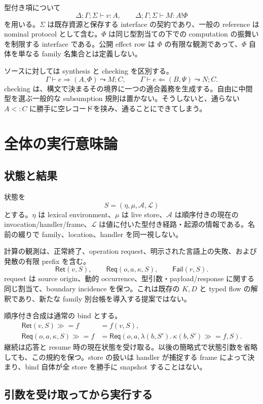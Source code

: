 \documentclass[11pt,a4paper]{article}
\theoremstyle{remark}
\newcommand{\Ret}{\mathsf{Ret}}
\newcommand{\Req}{\mathsf{Req}}
\newcommand{\bind}{\mathbin{\gg\!=}}
\begin{document}
型付き項について
\[
\Delta;\Gamma;\Sigma\vdash v:A,
\qquad
\Delta;\Gamma;\Sigma\vdash M:A\mathbin{!}\Phi
\]
を用いる。$\Sigma$ は既存資源と保存する interface の契約であり、一般の reference は nominal protocol として含む。$\Phi$ は同じ型割当ての下での computation の振舞いを制限する interface である。公開 effect row は $\Phi$ の有限な観測であって、$\Phi$ 自体を単なる family 名集合とは定義しない。

ソースに対しては synthesis と checking を区別する。
\[
\Gamma\vdash e\Rightarrow(A,\Phi)\leadsto M;C,
\qquad
\Gamma\vdash e\Leftarrow(B,\Psi)\leadsto N;C.
\]
checking は、構文で決まるその境界に一つの適合義務を生成する。自由に中間型を選ぶ一般的な subsumption 規則は置かない。そうしないと、通らない $A<:C$ に勝手に空レコードを挟み、通ることにできてしまう。

\section{全体の実行意味論}

\subsection{状態と結果}

状態を
\[
S=(\eta,\mu,\mathcal A,\mathcal L)
\]
とする。$\eta$ は lexical environment、$\mu$ は live store、$\mathcal A$ は順序付きの現在の invocation/handler/frame、$\mathcal L$ は値に付いた型付き経路・起源の情報である。名前の綴りで family、location、handler を同一視しない。

計算の観測は、正常終了、operation request、明示された言語上の失敗、および発散の有限 prefix を含む。
\[
\Ret(v,S),\qquad \Req(o,a,\kappa,S),\qquad
\mathsf{Fail}(r,S).
\]
request は source origin、動的 occurrence、型引数・payload/response に関する同じ割当て、boundary incidence を保つ。これは既存の $K,D$ と typed flow の解釈であり、新たな family 別台帳を導入する提案ではない。

順序付き合成は通常の bind とする。
\[
\begin{aligned}
\Ret(v,S)\bind f&=f(v,S),\\
\Req(o,a,\kappa,S)\bind f
 &=\Req(o,a,\lambda(b,S').\,\kappa(b,S')\bind f,S).
\end{aligned}
\]
継続は応答と resume 時の現在状態を受け取る。以後の簡略式で状態引数を省略しても、この規約を保つ。store の扱いは handler が捕捉する frame によって決まり、bind 自体が全 store を勝手に snapshot することはない。

\subsection{引数を受け取ってから実行する}
\end{document}
